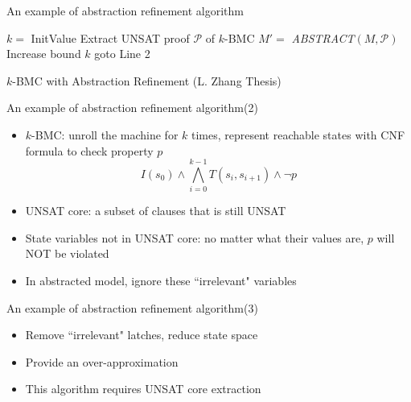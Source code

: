 \documentclass[xcolor=dvipsnames]{beamer}
\newcommand{\bi}{\begin{itemize}}
\newcommand{\ei}{\end{itemize}}
\begin{document}
\begin{frame}{\large{An example of abstraction refinement algorithm}}
\begin{algorithm}[H]
\SetAlgoNoLine
  $k = $ InitValue\;
  {
  }
  {
	Extract UNSAT proof $\mathcal P$ of $k$-BMC\;
	$M' = $ \textit{ABSTRACT}$(M,\mathcal P)$\;
  }
  {
  }
  {
	Increase bound $k$\;
	goto Line 2\;
  }
\caption{$k$-BMC with Abstraction Refinement (L. Zhang Thesis)}
\end{algorithm}
\end{frame}
\begin{frame}{\large{An example of abstraction refinement algorithm(2)}}
\bi
\item $k$-BMC: unroll the machine for $k$ times, represent reachable states with CNF formula to check property $p$
$$I(s_0)\land \bigwedge_{i=0}^{k-1}T(s_i,s_{i+1}) \land \neg p$$
\item UNSAT core: a subset of clauses that is still UNSAT
\item State variables not in UNSAT core: no matter what their values are, $p$ will NOT be violated
\item In abstracted model, ignore these ``irrelevant" variables
\ei
\end{frame}
\begin{frame}{\large{An example of abstraction refinement algorithm(3)}}
\begin{figure}[hbt]
\end{figure}
\bi
\item Remove ``irrelevant" latches, reduce state space
\item Provide an over-approximation
\item This algorithm requires \alert{UNSAT core extraction}
\ei
\end{frame}
\end{document}
